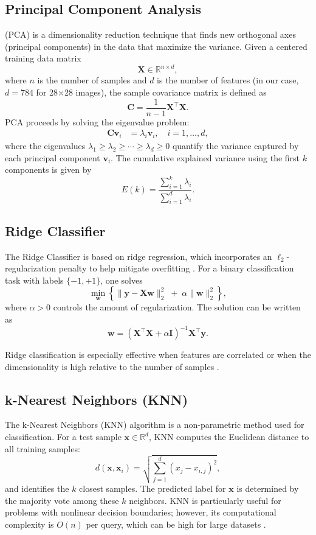 \documentclass[11pt]{amsart}
\begin{document}
\subsection{Principal Component Analysis} (PCA) is a dimensionality reduction technique that finds new orthogonal axes (principal components) in the data that maximize the variance. Given a centered training data matrix 
\[
\mathbf{X} \in \mathbb{R}^{n \times d},
\]
where \(n\) is the number of samples and \(d\) is the number of features (in our case, \(d=784\) for 28×28 images), the sample covariance matrix is defined as
\[
\mathbf{C} = \frac{1}{n-1}\mathbf{X}^\top \mathbf{X}.
\]
PCA \cite{Jolliffe2016} proceeds by solving the eigenvalue problem:
\begin{align*}
\mathbf{C}\mathbf{v}_i &= \lambda_i \mathbf{v}_i, \quad i = 1,\dots,d,
\end{align*}
where the eigenvalues \(\lambda_1 \geq \lambda_2 \geq \cdots \geq \lambda_d \geq 0\) quantify the variance captured by each principal component \(\mathbf{v}_i\). The cumulative explained variance using the first \(k\) components is given by
\[
E(k) = \frac{\sum_{i=1}^{k}\lambda_i}{\sum_{i=1}^{d}\lambda_i}.
\]


\subsection{Ridge Classifier}
The Ridge Classifier is based on ridge regression, which incorporates an \(\ell_2\)-regularization
penalty to help mitigate overfitting \cite{Hoerl1970}. For a binary classification task with
labels \(\{-1, +1\}\), one solves
\[
\min_{\mathbf{w}} \left\{ \|\mathbf{y} - \mathbf{X}\mathbf{w}\|_2^2 \;+\; \alpha \|\mathbf{w}\|_2^2 \right\},
\]
where \(\alpha > 0\) controls the amount of regularization. The solution can be written as
\[
\mathbf{w} = \left(\mathbf{X}^\top \mathbf{X} + \alpha \mathbf{I}\right)^{-1} \mathbf{X}^\top \mathbf{y}.
\]

Ridge classification is especially effective when features are correlated or when the dimensionality
is high relative to the number of samples \cite{Hoerl1970}.


\subsection{k-Nearest Neighbors (KNN)}
The k-Nearest Neighbors (KNN) algorithm is a non-parametric method used for classification. For a test sample \(\mathbf{x} \in \mathbb{R}^d\), KNN computes the Euclidean distance to all training samples:
\[
d(\mathbf{x}, \mathbf{x}_i) = \sqrt{\sum_{j=1}^{d} \left(x_j - x_{i,j}\right)^2},
\]
and identifies the \(k\) closest samples. The predicted label for \(\mathbf{x}\) is determined by the majority vote among these \(k\) neighbors. KNN is particularly useful for problems with nonlinear decision boundaries; however, its computational complexity is \(O(n)\) per query, which can be high for large datasets \cite{Cover1967}.
\end{document}
